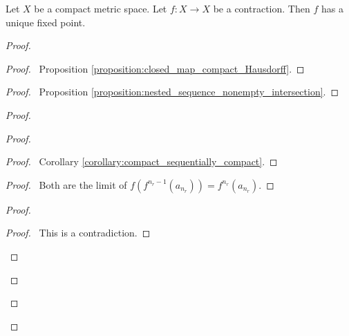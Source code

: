 \begin{proposition}
    Let $X$ be a compact metric space. Let $f : X \rightarrow X$ be a contraction.
    Then $f$ has a unique fixed point.
\end{proposition}

\begin{proof}
    \pf
    \begin{proof}
        \pf\ Proposition \ref{proposition:closed_map_compact_Hausdorff}.
    \end{proof}
    \begin{proof}
        \pf\ Proposition \ref{proposition:nested_sequence_nonempty_intersection}.
    \end{proof}
    \begin{proof}
        \begin{proof}
            \begin{proof}
                \pf\ Corollary \ref{corollary:compact_sequentially_compact}.
            \end{proof}
            \begin{proof}
                \pf\ Both are the limit of $f(f^{n_r-1}(a_{n_r})) = f^{n_r}(a_{n_r})$.
            \end{proof}
            \begin{proof}
                \qedstep
                \begin{proof}
                    \pf\ This is a contradiction.
                \end{proof}
            \end{proof}
        \end{proof}
    \end{proof}

\end{proof}
